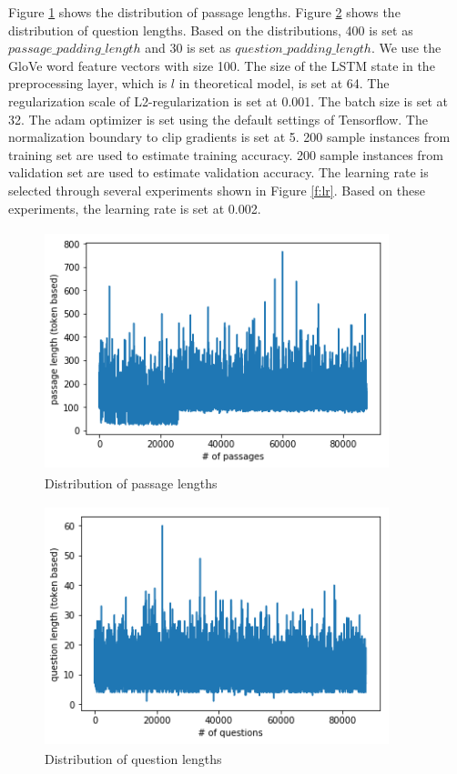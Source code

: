 \documentclass[modernstyle,12pt]{sjsuthesis}
\theoremstyle{definition}
\begin{document}
Figure \ref{f:passage_length} shows the distribution of passage lengths. Figure \ref{f:question_length} shows the distribution of question lengths. Based on the distributions, 400 is set as $passage\_padding\_length$ and 30 is set as $question\_padding\_length$. We use the GloVe word feature vectors with size 100. The size of the LSTM state in the preprocessing layer, which is $l$ in theoretical model, is set at 64. The regularization scale of L2-regularization is set at 0.001. The batch size is set at 32. The adam optimizer is set using the default settings of Tensorflow. The normalization boundary to clip gradients is set at 5. 200 sample instances from training set are used to estimate training accuracy. 200 sample instances from validation set are used to estimate validation accuracy. The learning rate is selected through several experiments shown in Figure \ref{f:lr}. Based on these experiments, the learning rate is set at 0.002.

\begin{figure}[htbp]\centering
  \includegraphics[width=10cm, height=7cm]{figures/passage_length.png}
  \caption{Distribution of passage lengths}
  \label{f:passage_length}
\end{figure}

\begin{figure}[htbp]\centering
  \includegraphics[width=10cm, height=7cm]{figures/question_length.png}
  \caption{Distribution of question lengths}
  \label{f:question_length}
\end{figure}
\end{document}
